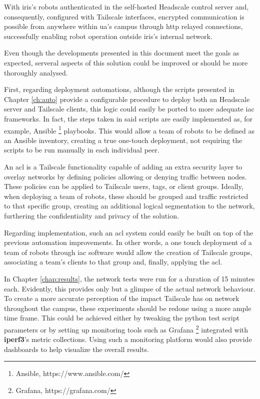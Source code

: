 \documentclass[11pt,twoside,a4paper]{report}
\begin{document}
With \ac{iris}'s robots authenticated in the self-hosted Headscale control server and, consequently, configured with Tailscale interfaces, encrypted communication is possible from anywhere within \ac{ua}'s campus through \ac{http} relayed connections, successfully enabling robot operation outside \ac{iris}'s internal network.

Even though the developments presented in this document meet the goals as expected, serveral aspects of this solution could be improved or should be more thoroughly analysed.

First, regarding deployment automations, although the scripts presented in Chapter \ref{ch:auto} provide a configurable procedure to deploy both an Headscale server and Tailscale clients, this logic could easily be ported to more adequate \ac{iac} frameworks. In fact, the steps taken in said scripts are easily implemented as, for example, Ansible \footnote{Ansible, https://www.ansible.com/} playbooks. This would allow a team of robots to be defined as an Ansible inventory, creating a true one-touch deployment, not requiring the scripts to be run manually in each individual peer.

An \ac{acl} is a Tailscale functionality capable of adding an extra security layer to overlay networks by defining policies allowing or denying traffic between nodes. These policies can be applied to Tailscale users, tags, or client groups. Ideally, when deploying a team of robots, these should be grouped and traffic restricted to that specific group, creating an additional logical segmentation to the network, furthering the confidentiality and privacy of the solution.

Regarding implementation, such an \ac{acl} system could easily be built on top of the previous automation improvements. In other words, a one touch deployment of a team of robots through \ac{iac} software would allow the creation of Tailscale groups, associating a team's clients to that group and, finally, applying the \ac{acl}.

In Chapter \ref{chap:results}, the network tests were run for a duration of 15 minutes each. Evidently, this provides only but a glimpse of the actual network behaviour. To create a more accurate perception of the impact Tailscale has on network throughout the campus, these experiments should be redone using a more ample time frame. This could be achieved either by tweaking the python test script parameters or by setting up monitoring tools such as Grafana \footnote{Grafana, https://grafana.com/} integrated with \textbf{iperf3}'s metric collections. Using such a monitoring platform would also provide dashboards to help visualize the overall results.
\end{document}
